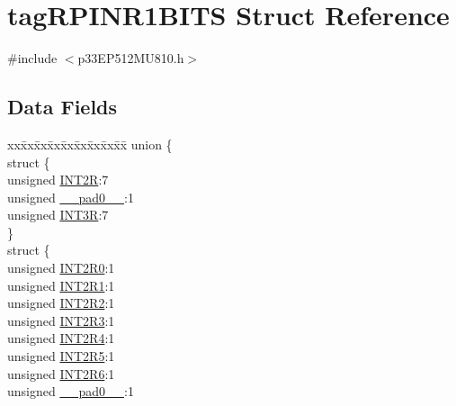 \hypertarget{structtag_r_p_i_n_r1_b_i_t_s}{}\section{tag\+R\+P\+I\+N\+R1\+B\+I\+TS Struct Reference}
\label{structtag_r_p_i_n_r1_b_i_t_s}


{\ttfamily \#include $<$p33\+E\+P512\+M\+U810.\+h$>$}

\subsection*{Data Fields}
\begin{DoxyCompactItemize}
\item 
\begin{tabbing}
xx\=xx\=xx\=xx\=xx\=xx\=xx\=xx\=xx\=\kill
union \{\\
\>struct \{\\
\>\>unsigned \hyperlink{structtag_r_p_i_n_r1_b_i_t_s_a667a899775bc60e21b3282fecaa0a212}{INT2R}:7\\
\>\>unsigned \hyperlink{structtag_r_p_i_n_r1_b_i_t_s_adf71f3d8410c1f1dbbc96680a92c49af}{\_\_pad0\_\_}:1\\
\>\>unsigned \hyperlink{structtag_r_p_i_n_r1_b_i_t_s_ab4e9255c9b57773f6485732741deb77f}{INT3R}:7\\
\>\} \\
\>struct \{\\
\>\>unsigned \hyperlink{structtag_r_p_i_n_r1_b_i_t_s_aecdd957a668b2ae54276a2fb9b02f4ca}{INT2R0}:1\\
\>\>unsigned \hyperlink{structtag_r_p_i_n_r1_b_i_t_s_a60722df9e81a082fd27101684e429139}{INT2R1}:1\\
\>\>unsigned \hyperlink{structtag_r_p_i_n_r1_b_i_t_s_afeee743383579e36042f8c0090f1d840}{INT2R2}:1\\
\>\>unsigned \hyperlink{structtag_r_p_i_n_r1_b_i_t_s_a8a90d2cab88f5f02b600bf4ee8bdb1ee}{INT2R3}:1\\
\>\>unsigned \hyperlink{structtag_r_p_i_n_r1_b_i_t_s_ab8624c38eaa69a66e408a2234ae4b45a}{INT2R4}:1\\
\>\>unsigned \hyperlink{structtag_r_p_i_n_r1_b_i_t_s_a622216d8b9120292217d169ce48b99eb}{INT2R5}:1\\
\>\>unsigned \hyperlink{structtag_r_p_i_n_r1_b_i_t_s_a9147adcf6b90bf53c4d929ec82c60c98}{INT2R6}:1\\
\>\>unsigned \hyperlink{structtag_r_p_i_n_r1_b_i_t_s_adf71f3d8410c1f1dbbc96680a92c49af}{\_\_pad0\_\_}:1\\

\end{tabbing}
\end{DoxyCompactItemize}
